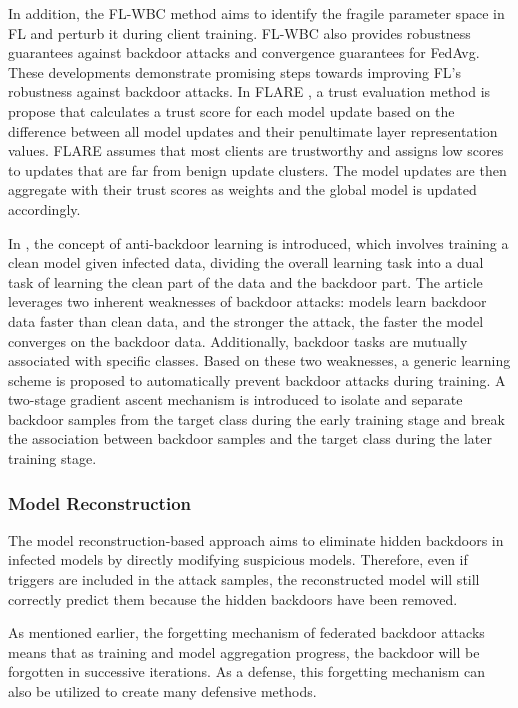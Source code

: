 \documentclass[conference]{IEEEtran}
\begin{document}
In addition, the FL-WBC \cite{b88} method aims to identify the fragile parameter space in FL and perturb it
during client training. FL-WBC also provides robustness guarantees against backdoor attacks and convergence guarantees for FedAvg.
These developments demonstrate promising steps towards improving FL's robustness against backdoor attacks. In FLARE \cite{b89}, a trust
evaluation method is propose that calculates a trust score for each model update based on the difference between all model updates and
their penultimate layer representation values. FLARE assumes that most clients are trustworthy and assigns low scores
to updates that are far from benign update clusters. The model updates are then aggregate with their trust scores as
weights and the global model is updated accordingly.

In \cite{b98}, the concept of anti-backdoor learning is introduced, which involves training a clean model given infected data,
dividing the overall learning task into a dual task of learning the clean part of the data and the backdoor part.
The article leverages two inherent weaknesses of backdoor attacks: models learn backdoor data faster than clean data,
and the stronger the attack, the faster the model converges on the backdoor data. Additionally, backdoor tasks are mutually
associated with specific classes. Based on these two weaknesses, a generic learning scheme is proposed to automatically prevent
backdoor attacks during training. A two-stage gradient ascent mechanism is introduced to isolate and separate backdoor samples
from the target class during the early training stage and break the association between backdoor samples and the target class during the later training stage.
\subsubsection{Model Reconstruction}
The model reconstruction-based approach aims to eliminate hidden backdoors in infected models by directly modifying suspicious models.
Therefore, even if triggers are included in the attack samples, the reconstructed model will still correctly predict them because
the hidden backdoors have been removed.

As mentioned earlier, the forgetting mechanism of federated backdoor attacks means that as training and model aggregation progress,
the backdoor will be forgotten in successive iterations. As a defense, this forgetting mechanism can also be utilized to create many defensive methods.
\end{document}
